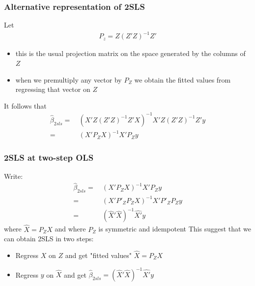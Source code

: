 \documentclass[a4paper,twoside,11pt]{article}
\begin{document}
\subsubsection{Alternative representation of 2SLS}
Let 
\begin{equation*}
\begin{aligned}
P_z = Z(Z'Z)^{-1} Z'
\end{aligned} 
\end{equation*}
\begin{itemize}
    \item this is the usual projection matrix on the space generated by the columns of $Z$
    \item when we premultiply any vector by $P_Z$ we obtain the fitted values from regressing that vector on $Z$
\end{itemize}
It follows that
\begin{equation*}
\begin{aligned}
\hat{\beta}_{2sls} =& \  (X'Z(Z'Z)^{-1} Z'X)^{-1} X'Z(Z'Z)^{-1} Z'y \\
=& \ (X'P_Z X)^{-1} X'P_Z y
\end{aligned} 
\end{equation*}
\subsubsection{2SLS at two-step OLS}
Write:
\begin{equation*}
\begin{aligned}
\hat{\beta}_{2sls} =& \  (X'P_Z X)^{-1} X'P_Z y\\
=& \ (X'P'_Z P_ZX)^{-1} X'P'_ZP_Zy \\
=& \ (\hat{X}' \hat{X})^{-1} \hat{X'}y
\end{aligned} 
\end{equation*}
where $\hat{X} = P_Z X$ and where $P_Z$ is symmetric and idempotent
\newline
\newline
This suggest that we can obtain 2SLS in two steps:
\begin{itemize}
    \item Regress $X$ on $Z$ and get "fitted values" $\hat{X} = P_Z X$ 
    \item Regress $y$ on $\hat{X}$ and get $\hat{\beta}_{2sls} = (\hat{X}' \hat{X})^{-1} \hat{X'}y$
\end{itemize}
\end{document}
